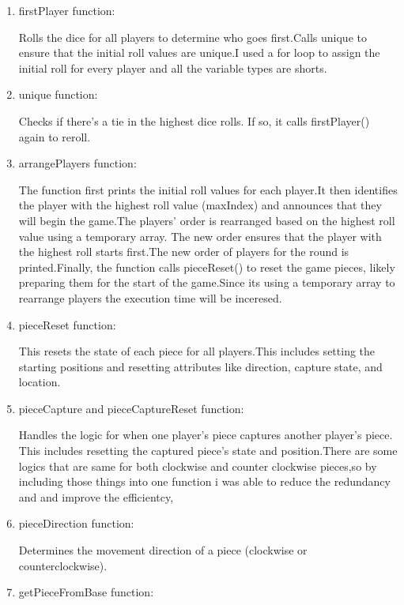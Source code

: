 \documentclass[a4paper,12pt]{article}
\begin{document}
\begin{enumerate}

\item firstPlayer function:

Rolls the dice for all players to determine who goes first.Calls unique to ensure that the initial roll values are unique.I used a for loop to assign the initial roll for every player and all the variable types are shorts.

\item unique function:

Checks if there's a tie in the highest dice rolls. If so, it calls firstPlayer() again to reroll.


\item arrangePlayers function:

The function first prints the initial roll values for each player.It then identifies the player with the highest roll value (maxIndex) and announces that they will begin the game.The players' order is rearranged based on the highest roll value using a temporary array. The new order ensures that the player with the highest roll starts first.The new order of players for the round is printed.Finally, the function calls pieceReset() to reset the game pieces, likely preparing them for the start of the game.Since its using a temporary array to rearrange players the execution time will be inceresed.


\item pieceReset function:

This resets the state of each piece for all players.This includes setting the starting positions and resetting attributes like direction, capture state, and location.

\item pieceCapture and pieceCaptureReset function:

Handles the logic for when one player's piece captures another player's piece. This includes resetting the captured piece's state and position.There are some logics that are same for both clockwise and counter clockwise pieces,so by including those things into one function i was able to reduce the redundancy and and improve the efficientcy,

\item pieceDirection function:

Determines the movement direction of a piece (clockwise or counterclockwise).

\item getPieceFromBase function:


\end{enumerate}
\end{document}
